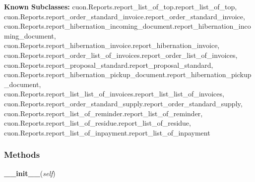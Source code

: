     \label{cuon:Reports:report_basics:report_basics}
\textbf{Known Subclasses:}
cuon.Reports.report\_list\_of\_top.report\_list\_of\_top,
    cuon.Reports.report\_order\_standard\_invoice.report\_order\_standard\_invoice,
    cuon.Reports.report\_hibernation\_incoming\_document.report\_hibernation\_incoming\_document,
    cuon.Reports.report\_hibernation\_invoice.report\_hibernation\_invoice,
    cuon.Reports.report\_order\_list\_of\_invoices.report\_order\_list\_of\_invoices,
    cuon.Reports.report\_proposal\_standard.report\_proposal\_standard,
    cuon.Reports.report\_hibernation\_pickup\_document.report\_hibernation\_pickup\_document,
    cuon.Reports.report\_list\_list\_of\_invoices.report\_list\_list\_of\_invoices,
    cuon.Reports.report\_order\_standard\_supply.report\_order\_standard\_supply,
    cuon.Reports.report\_list\_of\_reminder.report\_list\_of\_reminder,
    cuon.Reports.report\_list\_of\_residue.report\_list\_of\_residue,
    cuon.Reports.report\_list\_of\_inpayment.report\_list\_of\_inpayment



  \subsubsection{Methods}

    \label{cuon:Reports:report_basics:report_basics:__init__}

    \vspace{0.5ex}

\hspace{.8\funcindent}\begin{boxedminipage}{\funcwidth}

    \raggedright \textbf{\_\_init\_\_}(\textit{self})

\setlength{\parskip}{2ex}
\setlength{\parskip}{1ex}
    \end{boxedminipage}

    \label{cuon:Reports:report_basics:report_basics:getPdfEncoding}

